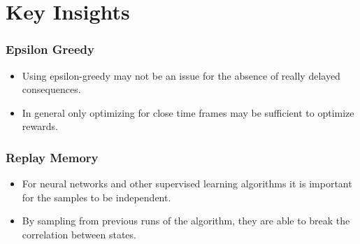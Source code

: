 \documentclass[12pt]{beamer}
\begin{document}
\section{Key Insights}
\begin{frame}
\frametitle{Epsilon Greedy}
\begin{itemize}
\item Using epsilon-greedy may not be an issue for the absence of really delayed consequences.
\item In general only optimizing for close time frames may be sufficient to optimize rewards.
\end{itemize}
\end{frame}

\begin{frame}
\frametitle{Replay Memory}
\begin{itemize}
\item For neural networks and other supervised learning algorithms it is important for the samples to be independent. 
\item By sampling from previous runs of the algorithm, they are able to break the correlation between states.
\end{itemize}
\end{frame}
\end{document}
